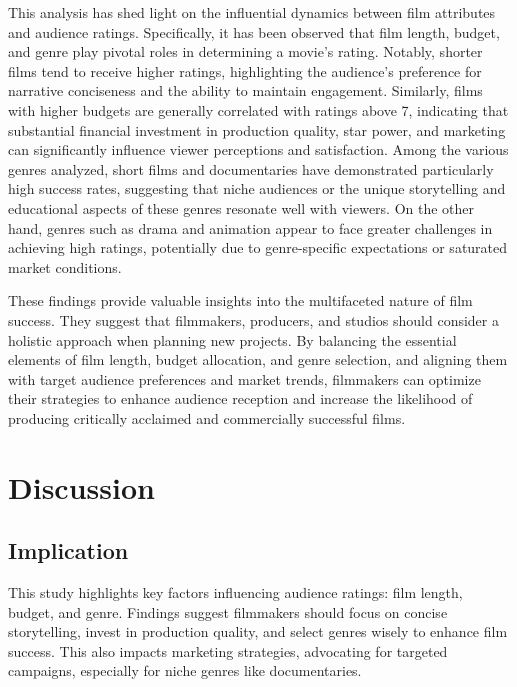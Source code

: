 \documentclass[
  11pt,
]{article}
\begin{document}
This analysis has shed light on the influential dynamics between film
attributes and audience ratings. Specifically, it has been observed that
film length, budget, and genre play pivotal roles in determining a
movie's rating. Notably, shorter films tend to receive higher ratings,
highlighting the audience's preference for narrative conciseness and the
ability to maintain engagement. Similarly, films with higher budgets are
generally correlated with ratings above 7, indicating that substantial
financial investment in production quality, star power, and marketing
can significantly influence viewer perceptions and satisfaction. Among
the various genres analyzed, short films and documentaries have
demonstrated particularly high success rates, suggesting that niche
audiences or the unique storytelling and educational aspects of these
genres resonate well with viewers. On the other hand, genres such as
drama and animation appear to face greater challenges in achieving high
ratings, potentially due to genre-specific expectations or saturated
market conditions.

These findings provide valuable insights into the multifaceted nature of
film success. They suggest that filmmakers, producers, and studios
should consider a holistic approach when planning new projects. By
balancing the essential elements of film length, budget allocation, and
genre selection, and aligning them with target audience preferences and
market trends, filmmakers can optimize their strategies to enhance
audience reception and increase the likelihood of producing critically
acclaimed and commercially successful films.

\hypertarget{discussion}{%
\section{Discussion}\label{discussion}}

\hypertarget{implication}{%
\subsection{Implication}\label{implication}}

This study highlights key factors influencing audience ratings: film
length, budget, and genre. Findings suggest filmmakers should focus on
concise storytelling, invest in production quality, and select genres
wisely to enhance film success. This also impacts marketing strategies,
advocating for targeted campaigns, especially for niche genres like
documentaries.
\end{document}
